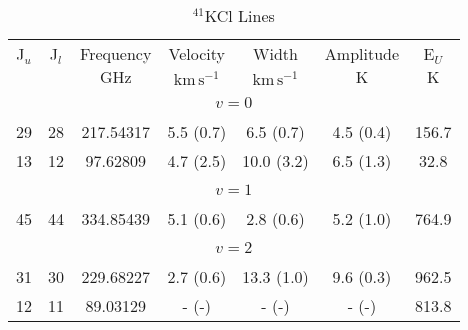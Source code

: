 \begin{table*}[htp]
\centering
\caption{$^{41}$KCl Lines}
\begin{tabular}{ccccccc}
\label{tab:41KCl_salt_lines}
 J$_u$ & J$_l$ & Frequency & Velocity & Width & Amplitude & E$_U$ \\
  &  & $\mathrm{GHz}$ & $\mathrm{km\,s^{-1}}$ & $\mathrm{km\,s^{-1}}$ & $\mathrm{K}$ & $\mathrm{K}$ \\
\hline
&\vspace{-0.75em}\\
\multicolumn{7}{c}{$v = 0$} \\
\vspace{-0.75em}\\
 29 & 28 & 217.54317 & 5.5 (0.7) & 6.5 (0.7) & 4.5 (0.4) & 156.7 \\
 13 & 12 & 97.62809 & 4.7 (2.5) & 10.0 (3.2) & 6.5 (1.3) & 32.8 \\
&\vspace{-0.75em}\\
\multicolumn{7}{c}{$v = 1$} \\
\vspace{-0.75em}\\
 45 & 44 & 334.85439 & 5.1 (0.6) & 2.8 (0.6) & 5.2 (1.0) & 764.9 \\
\hline
&\vspace{-0.75em}\\
\multicolumn{7}{c}{$v = 2$} \\
\vspace{-0.75em}\\
 31 & 30 & 229.68227 & 2.7 (0.6) & 13.3 (1.0) & 9.6 (0.3) & 962.5 \\
 12 & 11 & 89.03129 & - (-) & - (-) & - (-) & 813.8 \\
\end{tabular}

\par 
\end{table*}
